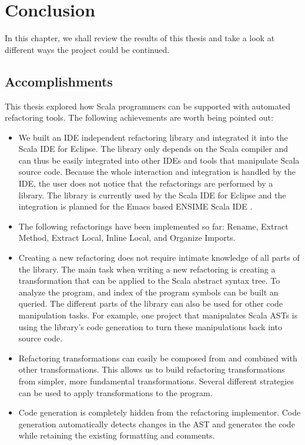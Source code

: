 \documentclass[10pt,a4paper,oneside]{scrreprt}
\begin{document}
\label{end-chapter:testing}

\chapter{Conclusion} \label{chapter:outlook}

In this chapter, we shall review the results of this thesis and take a look at different ways the project could be continued.

\section{Accomplishments}

This thesis explored how Scala programmers can be supported with automated refactoring tools. The following achievements are worth being pointed out: 

\begin{itemize}
  \item We built an IDE independent refactoring library and integrated it into the Scala IDE for Eclipse. The library only depends on the Scala compiler and can thus be easily integrated into other IDEs and tools that manipulate Scala source code. Because the whole interaction and integration is handled by the IDE, the user does not notice that the refactorings are performed by a library. The library is currently used by the Scala IDE for Eclipse \cite{EclipseScalaIDE} and the integration is planned for the Emacs based ENSIME Scala IDE \cite{Ensime}.

  \item The following refactorings have been implemented so far: Rename, Extract Method, Extract Local, Inline Local, and Organize Imports.

  \item Creating a new refactoring does not require intimate knowledge of all parts of the library. The main task when writing a new refactoring is creating a transformation that can be applied to the Scala abstract syntax tree. To analyze the program, and index of the program symbols can be built an queried. The different parts of the library can also be used for other code manipulation tasks. For example, one project \cite{RichardEmberson} that manipulates Scala ASTs  is using the library's code generation to turn these manipulations back into source code.

  \item Refactoring transformations can easily be composed from and combined with other transformations. This allows us to build refactoring transformations from simpler, more fundamental transformations. Several different strategies can be used to apply transformations to the program.

  \item Code generation is completely hidden from the refactoring implementor. Code generation automatically detects changes in the AST and generates the code while retaining the existing formatting and comments.
\end{itemize}
\end{document}
